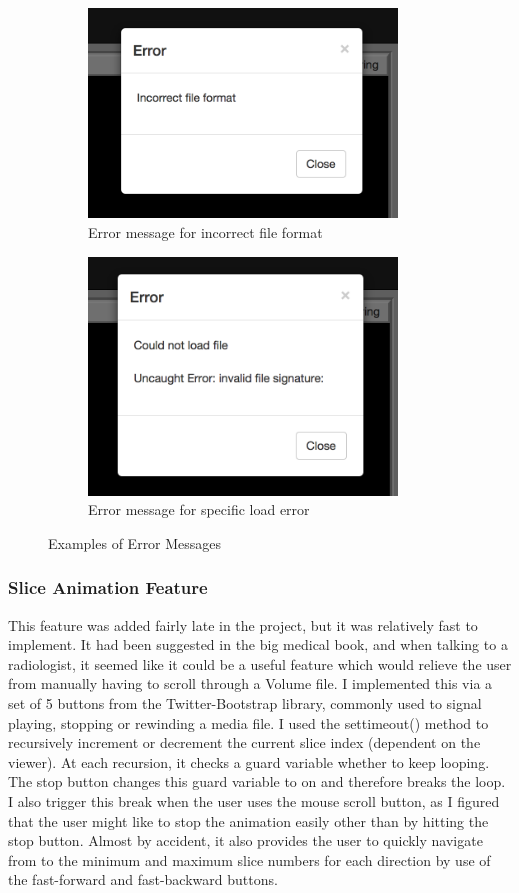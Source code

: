 \documentclass[a4paper,11pt,twoside]{article}
\begin{document}
\begin{figure}
\centering
\begin{subfigure}{.5\textwidth}
  \centering
  \includegraphics[width=82mm]{graphics/error_01.png}
  \caption{Error message for incorrect file format}
\end{subfigure}%
\begin{subfigure}{.5\textwidth}
  \centering
  \includegraphics[width=82mm]{graphics/error_02.png}
  \caption{Error message for specific load error}
\end{subfigure}
\caption{Examples of Error Messages}

\end{figure}



\subsubsection{Slice Animation Feature}

This feature was added fairly late in the project, but it was relatively fast to implement. It had been suggested in the big medical book, and when talking to a radiologist, it seemed like it could be a useful feature which would relieve the user from manually having to scroll through a Volume file. I implemented this via a set of 5 buttons from the Twitter-Bootstrap library, commonly used to signal playing, stopping or rewinding a media file. I used the settimeout() method to recursively increment or decrement the current slice index (dependent on the viewer). At each recursion, it checks a guard variable whether to keep looping. The stop button changes this guard variable to on and therefore breaks the loop. I also trigger this break when the user uses the mouse scroll button, as I figured that the user might like to stop the animation easily other than by hitting the stop button. Almost by accident, it also provides the user to quickly navigate from to the minimum and maximum slice numbers for each direction by use of the fast-forward and fast-backward buttons.
\end{document}
